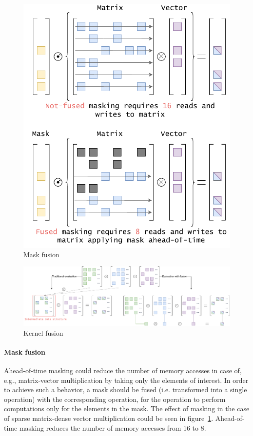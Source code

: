\documentclass[10pt,conference]{IEEEtran}
\begin{document}
\begin{figure}
  \centering
  \includegraphics[width=\linewidth]{figs/MaskFusionIA3_2.pdf}
  \caption{Mask fusion}
  \label{fig:mask_fusion}
\end{figure}

\begin{figure}[t]
  \includegraphics[width=\textwidth]{figs/KernelFusionIA3_2.pdf}
  \caption{Kernel fusion}
  \label{fig:kernel_fusion}
\end{figure}

\paragraph*{Mask fusion}
Ahead-of-time masking could reduce the number of memory accesses in case of, e.g., matrix-vector multiplication by taking only the elements of interest.
In order to achieve such a behavior, a mask should be fused (i.e. transformed into a single operation) with the corresponding operation, for the operation to perform computations only for the elements in the mask.
The effect of masking in the case of sparse matrix-dense vector multiplication could be seen in figure~\ref{fig:mask_fusion}.
Ahead-of-time masking reduces the number of memory accesses from 16 to 8.
\end{document}
